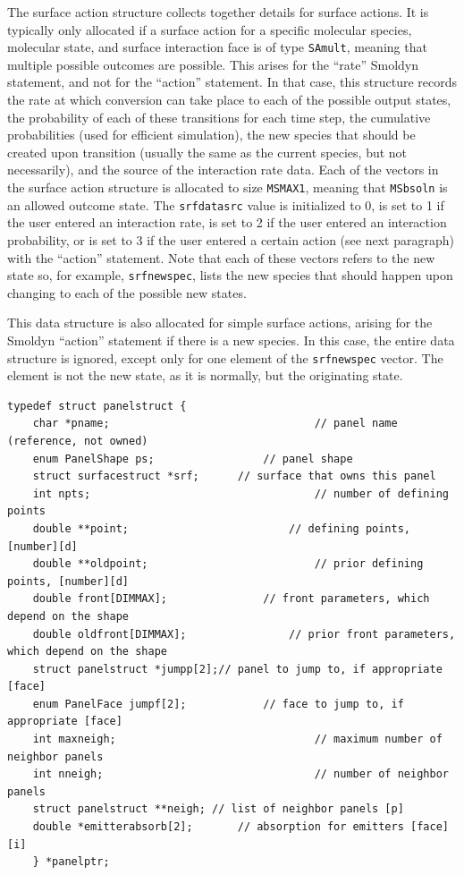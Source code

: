 \documentclass {scrbook}
\newcommand {\ttt} {\texttt}
\begin{document}
The surface action structure collects together details for surface actions. It is typically only allocated if a surface action for a specific molecular species, molecular state, and surface interaction face is of type \ttt{SAmult}, meaning that multiple possible outcomes are possible. This arises for the ``rate'' Smoldyn statement, and not for the ``action'' statement. In that case, this structure records the rate at which conversion can take place to each of the possible output states, the probability of each of these transitions for each time step, the cumulative probabilities (used for efficient simulation), the new species that should be created upon transition (usually the same as the current species, but not necessarily), and the source of the interaction rate data. Each of the vectors in the surface action structure is allocated to size \ttt{MSMAX1}, meaning that \ttt{MSbsoln} is an allowed outcome state. The \ttt{srfdatasrc} value is initialized to 0, is set to 1 if the user entered an interaction rate, is set to 2 if the user entered an interaction probability, or is set to 3 if the user entered a certain action (see next paragraph) with the ``action'' statement. Note that each of these vectors refers to the new state so, for example, \ttt{srfnewspec}, lists the new species that should happen upon changing to each of the possible new states.

This data structure is also allocated for simple surface actions, arising for the Smoldyn ``action'' statement if there is a new species. In this case, the entire data structure is ignored, except only for one element of the \ttt{srfnewspec} vector. The element is not the new state, as it is normally, but the originating state.

\begin{lstlisting}
typedef struct panelstruct {
	char *pname;								// panel name (reference, not owned)
	enum PanelShape ps;					// panel shape
	struct surfacestruct *srf;		// surface that owns this panel
	int npts;									// number of defining points
	double **point;							// defining points, [number][d]
	double **oldpoint;							// prior defining points, [number][d]
	double front[DIMMAX];				// front parameters, which depend on the shape
	double oldfront[DIMMAX];				// prior front parameters, which depend on the shape
	struct panelstruct *jumpp[2];// panel to jump to, if appropriate [face]
	enum PanelFace jumpf[2];			// face to jump to, if appropriate [face]
	int maxneigh;								// maximum number of neighbor panels
	int nneigh;									// number of neighbor panels
	struct panelstruct **neigh;	// list of neighbor panels [p]
	double *emitterabsorb[2];		// absorption for emitters [face][i]
	} *panelptr;
\end{lstlisting}
\end{document}
